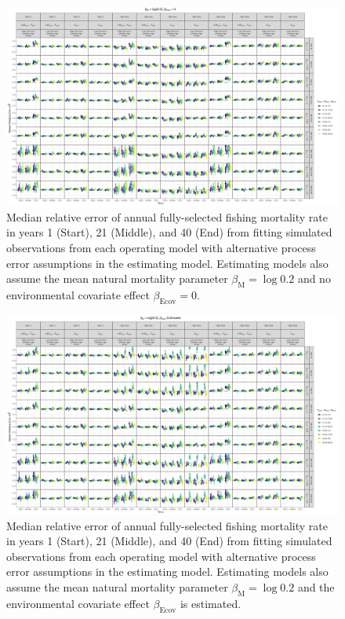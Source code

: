 \documentclass[
  12pt,
]{article}
\begin{document}
\begin{landscape}
\begin{figure}
\caption{Median relative error of annual fully-selected fishing mortality rate in years 1 (Start), 21 (Middle), and 40 (End) from fitting simulated observations from each operating model with alternative process error assumptions in the estimating model. Estimating models also assume the mean natural mortality parameter $\beta_\text{M} = \log 0.2$ and no environmental covariate effect $\beta_\text{Ecov} = 0$.}\label{F_bias_M_fixed_beta_fixed}
\begin{center}
\includegraphics[height = \textheight]{F_bias_all_PE_effect_M_fixed_beta_fixed.png}
\end{center}
\end{figure}
\end{landscape}

\begin{landscape}
\begin{figure}
\caption{Median relative error of annual fully-selected fishing mortality rate in years 1 (Start), 21 (Middle), and 40 (End) from fitting simulated observations from each operating model with alternative process error assumptions in the estimating model. Estimating models also assume the mean natural mortality parameter $\beta_\text{M} = \log 0.2$ and the environmental covariate effect $\beta_\text{Ecov}$ is estimated.}\label{F_bias_M_fixed_beta_estimated}
\begin{center}
\includegraphics[height = \textheight]{F_bias_all_PE_effect_M_fixed_beta_estimated.png}
\end{center}
\end{figure}
\end{landscape}
\end{document}
